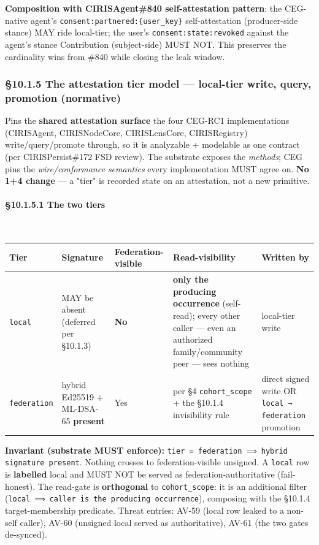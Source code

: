 \documentclass[10pt]{article}
\begin{document}
\textbf{Composition with CIRISAgent\#840 self-attestation pattern}: the CEG-native agent's \texttt{consent:partnered:\{user\_key\}} self-attestation (producer-side stance) MAY ride local-tier; the user's \texttt{consent:state:revoked} against the agent's stance Contribution (subject-side) MUST NOT. This preserves the cardinality wins from \#840 while closing the leak window.


\subsubsection*{§10.1.5 The attestation tier model — local-tier write, query, promotion (normative)}


Pins the \textbf{shared attestation surface} the four CEG-RC1 implementations (CIRISAgent, CIRISNodeCore, CIRISLensCore, CIRISRegistry) write/query/promote through, so it is analyzable + modelable as one contract (per CIRISPersist\#172 FSD review). The substrate exposes the \textit{methods}; CEG pins the \textit{wire/conformance semantics} every implementation MUST agree on. \textbf{No 1+4 change} — a "tier" is recorded state on an attestation, not a new primitive.


\paragraph{§10.1.5.1 The two tiers}\mbox{}\\


{\scriptsize
\begin{longtable}{|p{3.2cm}|p{3.2cm}|p{3.2cm}|p{3.2cm}|p{3.2cm}|}\hline
\textbf{Tier} & \textbf{Signature} & \textbf{Federation-visible} & \textbf{Read-visibility} & \textbf{Written by} \\ \hline\endhead
\texttt{local} & MAY be absent (deferred per §10.1.3) & \textbf{No} & \textbf{only the producing occurrence} (self-read); every other caller — even an authorized family/community peer — sees nothing & local-tier write \\ \hline
\texttt{federation} & hybrid Ed25519 + ML-DSA-65 \textbf{present} & Yes & per §4 \texttt{cohort\_scope} + the §10.1.4 invisibility rule & direct signed write OR \texttt{local → federation} promotion \\ \hline
\end{longtable}}


\textbf{Invariant (substrate MUST enforce):} \texttt{tier = federation ⟹ hybrid signature present}. Nothing crosses to federation-visible unsigned. A \texttt{local} row is \textbf{labelled} local and MUST NOT be served as federation-authoritative (fail-honest). The read-gate is \textbf{orthogonal} to \texttt{cohort\_scope}: it is an additional filter (\texttt{local ⟹ caller is the producing occurrence}), composing with the §10.1.4 target-membership predicate. Threat entries: AV-59 (local row leaked to a non-self caller), AV-60 (unsigned local served as authoritative), AV-61 (the two gates de-synced).
\end{document}
